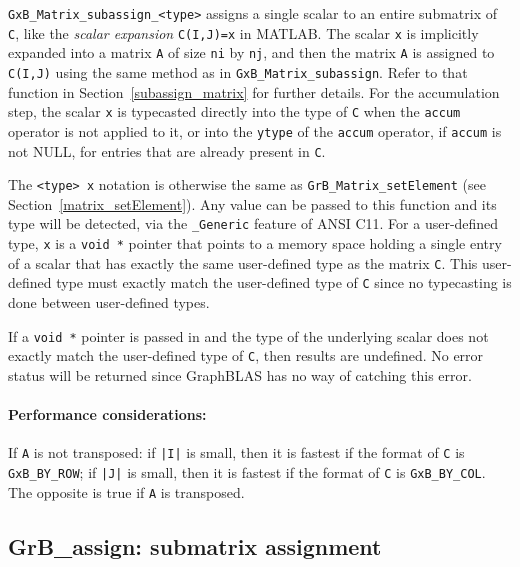 \documentclass[12pt]{article}
\begin{document}
\verb'GxB_Matrix_subassign_<type>' assigns a single scalar to an entire
submatrix of \verb'C', like the {\em scalar expansion} \verb'C(I,J)=x' in
MATLAB.  The scalar \verb'x' is implicitly expanded into a matrix \verb'A' of
size \verb'ni' by \verb'nj', and then the matrix \verb'A' is assigned to
\verb'C(I,J)' using the same method as in \verb'GxB_Matrix_subassign'.  Refer
to that function in Section~\ref{subassign_matrix} for further details.
For the accumulation step, the scalar \verb'x' is typecasted directly into the
type of \verb'C' when the \verb'accum' operator is not applied to it, or into
the \verb'ytype' of the \verb'accum' operator, if \verb'accum' is not NULL, for
entries that are already present in \verb'C'.

The \verb'<type> x' notation is otherwise the same as
\verb'GrB_Matrix_setElement' (see Section~\ref{matrix_setElement}).  Any value
can be passed to this function and its type will be detected, via the
\verb'_Generic' feature of ANSI C11.  For a user-defined type, \verb'x' is a
\verb'void *' pointer that points to a memory space holding a single entry of a
scalar that has exactly the same user-defined type as the matrix \verb'C'.
This user-defined type must exactly match the user-defined type of \verb'C'
since no typecasting is done between user-defined types.

If a \verb'void *' pointer is passed in and the type of the underlying scalar
does not exactly match the user-defined type of \verb'C', then results are
undefined.  No error status will be returned since GraphBLAS has no way of
catching this error.

\paragraph{\bf Performance considerations:} %
If \verb'A' is not transposed: if \verb'|I|' is small, then it is fastest if
the format of \verb'C' is \verb'GxB_BY_ROW'; if \verb'|J|' is small, then it is
fastest if the format of \verb'C' is \verb'GxB_BY_COL'.  The opposite is true
if \verb'A' is transposed.

\newpage
\subsection{{\sf GrB\_assign:} submatrix assignment} %
\label{assign}
\end{document}
